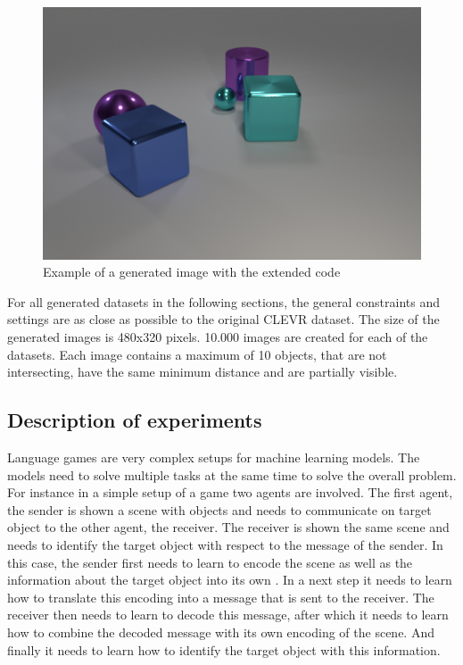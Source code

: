 \begin{figure}[h]
    \centering
    \includegraphics[width=.8\linewidth]{figures/CLEVR_extended_example.png}
    \caption{Example of a generated image with the extended code}
    \label{fig:clevr-extended_example}
\end{figure}

For all generated datasets in the following sections, the general constraints and settings are as close as possible to the original CLEVR dataset. The size of the generated images is 480x320 pixels. 10.000 images are created for each of the datasets. Each image contains a maximum of 10 objects, that are not intersecting, have the same minimum distance and are partially visible.

\subsection{Description of experiments}
Language games are very complex setups for machine learning models. The models need to solve multiple tasks at the same time to solve the overall problem. For instance in a simple setup of a game two agents are involved. The first agent, the sender is shown a scene with objects and needs to communicate on target object to the other agent, the receiver. The receiver is shown the same scene and needs to identify the target object with respect to the message of the sender. In this case, the sender first needs to learn to encode the scene as well as the information about the target object into its own . In a next step it needs to learn how to translate this encoding into a message that is sent to the receiver. The receiver then needs to learn to decode this message, after which it needs to learn how to combine the decoded message with its own encoding of the scene. And finally it needs to learn how to identify the target object with this information.

